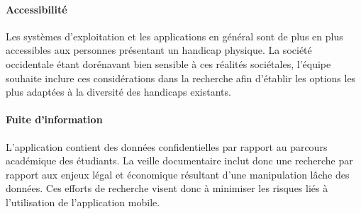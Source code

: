 	\paragraph{Accessibilité} Les systèmes d'exploitation et les applications en général sont de plus en plus accessibles aux personnes présentant un handicap physique. La société occidentale étant dorénavant bien sensible à ces réalités sociétales, l'équipe souhaite inclure ces considérations dans la recherche afin d'établir les options les plus adaptées à la diversité des handicaps existants.
	
	\paragraph{Fuite d'information} L'application contient des données confidentielles par rapport au parcours académique des étudiants. La veille documentaire inclut donc une recherche par rapport aux enjeux légal et économique résultant d'une manipulation lâche des données. Ces efforts de recherche visent donc à minimiser les risques liés à l'utilisation de l'application mobile.
		
	
	